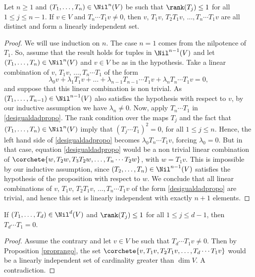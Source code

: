 \begin{prop}\label{proprango}
Let $n\geq 1$ and $(T_1,\dots,T_n)\in \Nil^{n}(V)$ be such that $\rank(T_j)\leq 1$ for all $1\leq j\leq n-1$. If $v\in V$ and $T_n\cdots T_{1}v\neq 0$, then $v$, $T_1{v}$, $T_{2}T_{1}v$, $\dots,T_{n}\cdots T_{1}v$ are all distinct and form a linearly independent set.
\end{prop}
\begin{proof} We will use induction on $n$. The case $n=1$ comes from the nilpotence of $T_1$. So, assume that the result holds for tuples in $\Nil^{n-1}(V)$ and let $(T_1,\dots,T_{n})\in \Nil^{n}(V)$ and $v\in V$ be as in the hypothesis.
Take a linear combination of $v$, $T_1{v}$, $\dots,T_{n}\cdots T_{1}$ of the form\vspace*{-3pt}\enlargethispage{\baselineskip}%
\begin{equation}\label{desigualdadpropo}
\lambda_{0}v+\lambda_{1}T_1{v}+\dots+\lambda_{n-1}T_{n-1}\cdots T_{1}v+\lambda_{n}T_{n}\cdots T_{1}v=0,
\end{equation}
and suppose that this linear combination is non trivial. As $(T_1,\dots,T_{n-1})\in \Nil^{n-1}(V)$ also satisfies the hypothesis with respect to $v$, by our inductive assumption we have $\lambda_{n}\neq 0$.
Now, apply $T_{n}\cdots T_{1}$ in \eqref{desigualdadpropo}. The rank condition over the maps $T_{j}$ and the fact that $(T_1,\dots,T_n)\in \Nil^{n}(V)$ imply that $(T_{j}\cdots T_{1})^{2}=0$, for all $1\leq j \leq n$. Hence, the left hand side of \eqref{desigualdadpropo} becomes $\lambda_{0}T_{n}\cdots T_{1}v$, forcing $\lambda_{0}=0$. But in that case, equation \eqref{desigualdadpropo} would be a non trivial linear combination of $\corchete{w,T_{2}{w},T_{3}T_{2}w,\dots,T_{n}\cdots T_{2}w}$, with $w=T_{1}v$. This is impossible by our inductive assumption, since $(T_{2},\dots,T_{n})\in \Nil^{n-1}(V)$ satisfies the hypothesis of the proposition with respect to $w$. We conclude that all linear combinations of $v$, $T_1{v}$, $T_{2}T_{1}v$, $\dots,T_{n}\cdots T_{1}v$ of the form \eqref{desigualdadpropo} are trivial, and hence this set is linearly independent with exactly $n+1$ elements.
\end{proof}

\begin{coro}\label{cororango}
If $(T_1,\dots,T_d)\in \Nil^{d}(V)$ and $\rank(T_j)\leq 1$ for all $1 \leq j\leq d-1$, then $T_d\cdots T_1=0$.
\end{coro}
\begin{proof}
Assume the contrary and let $v\in V$ be such that $T_{d}\cdots T_{1}v\neq 0$. Then by Proposition \ref{proprango}, the set $\corchete{v,T_1{v},T_{2}T_{1}v,\dots,T_{d}\cdots T_{1}v}$ would be a linearly independent set of cardinality greater than $\dim{V}$. A contradiction.
\end{proof}

